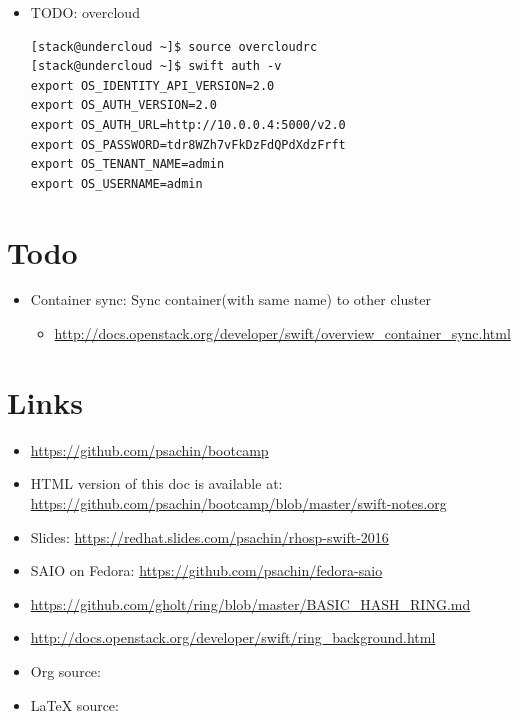 \documentclass{article}
\begin{document}
\begin{itemize}
\item TODO: overcloud

\begin{verbatim}
[stack@undercloud ~]$ source overcloudrc
[stack@undercloud ~]$ swift auth -v
export OS_IDENTITY_API_VERSION=2.0
export OS_AUTH_VERSION=2.0
export OS_AUTH_URL=http://10.0.0.4:5000/v2.0
export OS_PASSWORD=tdr8WZh7vFkDzFdQPdXdzFrft
export OS_TENANT_NAME=admin
export OS_USERNAME=admin
\end{verbatim}
\end{itemize}

\section{Todo}
\label{sec:orgae8bcc6}
\begin{itemize}
\item Container sync: Sync container(with same name) to other cluster
\begin{itemize}
\item \url{http://docs.openstack.org/developer/swift/overview\_container\_sync.html}
\end{itemize}
\end{itemize}

\section{Links}
\label{sec:org24d4d02}
\begin{itemize}
\item \url{https://github.com/psachin/bootcamp}
\item HTML version of this doc is available at: \url{https://github.com/psachin/bootcamp/blob/master/swift-notes.org}
\item Slides: \url{https://redhat.slides.com/psachin/rhosp-swift-2016}
\item SAIO on Fedora: \url{https://github.com/psachin/fedora-saio}
\item \url{https://github.com/gholt/ring/blob/master/BASIC\_HASH\_RING.md}
\item \url{http://docs.openstack.org/developer/swift/ring\_background.html}
\item Org source: 
\item \LaTeX{} source: 
\end{itemize}
\end{document}
